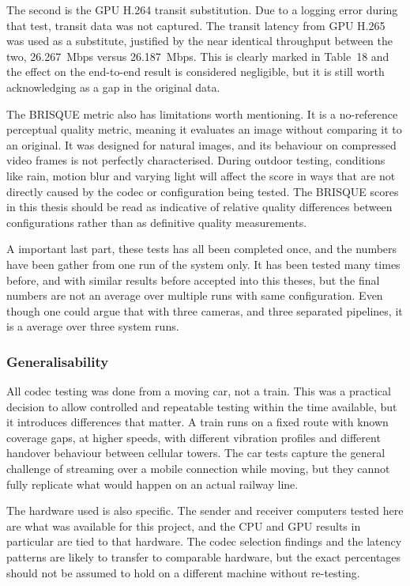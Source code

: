The second is the GPU H.264 transit substitution. Due to a logging error during that test, transit data was not captured. The transit latency from GPU H.265 was used as a substitute, justified by the near identical throughput between the two, 26.267~Mbps versus 26.187~Mbps. This is clearly marked in Table~18 and the effect on the end-to-end result is considered negligible, but it is still worth acknowledging as a gap in the original data.
 
The BRISQUE metric also has limitations worth mentioning. It is a no-reference perceptual quality metric, meaning it evaluates an image without comparing it to an original. It was designed for natural images, and its behaviour on compressed video frames is not perfectly characterised. During outdoor testing, conditions like rain, motion blur and varying light will affect the score in ways that are not directly caused by the codec or configuration being tested. The BRISQUE scores in this thesis should be read as indicative of relative quality differences between configurations rather than as definitive quality measurements.

A important last part, these tests has all been completed once, and the numbers have been gather from one run of the system only. It has been tested many times before, and with similar results before accepted into this theses, but the final numbers are not an average over multiple runs with same configuration. Even though one could argue that with three cameras, and three separated pipelines, it is a average over three system runs. 


\subsubsection{Generalisability}\label{subsubsec:generalisability}

All codec testing was done from a moving car, not a train. This was a practical decision to allow controlled and repeatable testing within the time available, but it introduces differences that matter. A train runs on a fixed route with known coverage gaps, at higher speeds, with different vibration profiles and different handover behaviour between cellular towers. The car tests capture the general challenge of streaming over a mobile connection while moving, but they cannot fully replicate what would happen on an actual railway line.
 
The hardware used is also specific. The sender and receiver computers tested here are what was available for this project, and the CPU and GPU results in particular are tied to that hardware. The codec selection findings and the latency patterns are likely to transfer to comparable hardware, but the exact percentages should not be assumed to hold on a different machine without re-testing.
 
